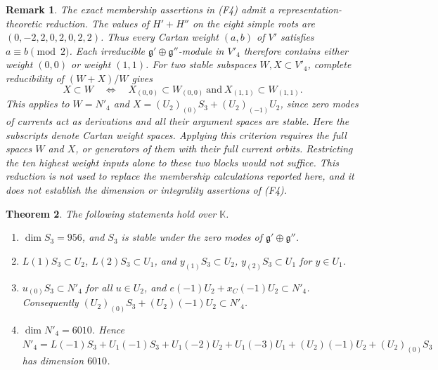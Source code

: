 \documentclass[leqno]{article}
\newcommand{\K}{\ensuremath{\mathbb{K}}}
\newtheorem{thm}{Theorem}[section]
\newtheorem{remark}[thm]{Remark}
\numberwithin{equation}{section}
\begin{document}
\begin{remark} \normalfont
\label{rem:two-cartan-blocks}
The exact membership assertions in \textup{(F4)} admit a representation-theoretic reduction. The values of $H'+H''$ on the eight simple roots are $(0,-2,2,0,2,0,2,2)$. Thus every Cartan weight $(a,b)$ of $V'$ satisfies $a \equiv b \pmod 2$. Each irreducible $\mathfrak g' \oplus \mathfrak g''$-module in $V'_4$ therefore contains either weight $(0,0)$ or weight $(1,1)$. For two stable subspaces $W,X \subset V'_4$, complete reducibility of $(W+X)/W$ gives
\[
X \subset W \quad\Longleftrightarrow\quad X_{(0,0)} \subset W_{(0,0)} \ \text{and}\ X_{(1,1)} \subset W_{(1,1)}.
\]
This applies to $W = N'_4$ and $X = (U_2)_{(0)}S_3+(U_2)_{(-1)}U_2$, since zero modes of currents act as derivations and all their argument spaces are stable. Here the subscripts denote Cartan weight spaces. Applying this criterion requires the full spaces $W$ and $X$, or generators of them with their full current orbits. Restricting the ten highest weight inputs alone to these two blocks would not suffice. This reduction is not used to replace the membership calculations reported here, and it does not establish the dimension or integrality assertions of \textup{(F4)}.
\end{remark}

\begin{thm}
\label{thm:exact-weight-three}
The following statements hold over $\K$.
\begin{enumerate}
\item $\dim S_3 = 956$, and $S_3$ is stable under the zero modes of $\mathfrak g' \oplus \mathfrak g''$.
\item $L(1)S_3 \subset U_2$, $L(2)S_3 \subset U_1$, and $y_{(1)}S_3 \subset U_2$, $y_{(2)}S_3 \subset U_1$ for $y \in U_1$.
\item $u_{(0)}S_3 \subset N'_4$ for all $u \in U_2$, and $e(-1)U_2 + x_C(-1)U_2 \subset N'_4$. Consequently $(U_2)_{(0)}S_3 + (U_2)(-1)U_2 \subset N'_4$.
\item $\dim N'_4 = 6010$. Hence $N'_4 = L(-1)S_3 + U_1(-1)S_3 + U_1(-2)U_2 + U_1(-3)U_1 + (U_2)(-1)U_2 + (U_2)_{(0)}S_3$ has dimension $6010$.
\end{enumerate}
\end{thm}
\end{document}
